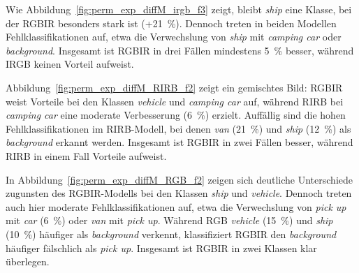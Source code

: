 %     

Wie Abbildung~\ref{fig:perm_exp_diffM_irgb_f3} zeigt, bleibt \textit{ship} eine Klasse, bei der RGBIR besonders stark ist (+21~\%). Dennoch treten in beiden Modellen Fehlklassifikationen auf, etwa die Verwechslung von \textit{ship} mit \textit{camping car} oder \textit{background}. Insgesamt ist RGBIR in drei Fällen mindestens 5~\% besser, während IRGB keinen Vorteil aufweist.

%     

Abbildung~\ref{fig:perm_exp_diffM_RIRB_f2} zeigt ein gemischtes Bild: RGBIR weist Vorteile bei den Klassen \textit{vehicle} und \textit{camping car} auf, während RIRB bei \textit{camping car} eine moderate Verbesserung (6~\%) erzielt. Auffällig sind die hohen Fehlklassifikationen im RIRB-Modell, bei denen \textit{van} (21~\%) und \textit{ship} (12~\%) als \textit{background} erkannt werden. Insgesamt ist RGBIR in zwei Fällen besser, während RIRB in einem Fall Vorteile aufweist.

%     

In Abbildung~\ref{fig:perm_exp_diffM_RGB_f2} zeigen sich deutliche Unterschiede zugunsten des RGBIR-Modells bei den Klassen \textit{ship} und \textit{vehicle}. Dennoch treten auch hier moderate Fehlklassifikationen auf, etwa die Verwechslung von \textit{pick up} mit \textit{car} (6~\%) oder \textit{van} mit \textit{pick up}. Während RGB \textit{vehicle} (15~\%) und \textit{ship} (10~\%) häufiger als \textit{background} verkennt, klassifiziert RGBIR den \textit{background} häufiger fälschlich als \textit{pick up}. Insgesamt ist RGBIR in zwei Klassen klar überlegen.

